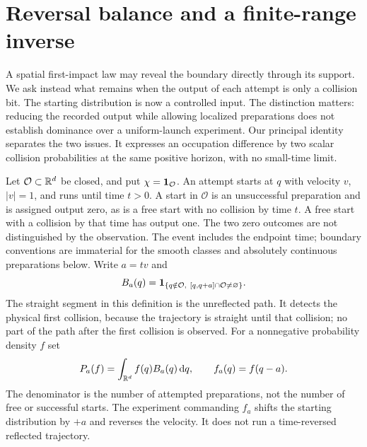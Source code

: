 \section{Reversal balance and a finite-range inverse}
\label{sec:reversal}
A spatial first-impact law may reveal the boundary directly through its
support. We ask instead what remains when the output of each attempt is
only a collision bit. The starting distribution is now a controlled
input. The distinction matters: reducing the recorded output while
allowing localized preparations does not establish dominance over a
uniform-launch experiment. Our principal identity separates the two
issues. It expresses an occupation difference by two scalar collision
probabilities at the same positive horizon, with no small-time limit.

Let $\mathcal O\subset\mathbb R^d$ be closed, and put $\chi=\mathbf 1_{\mathcal O}$.
An attempt starts at $q$ with velocity $v$, $|v|=1$, and runs until time
$t>0$. A start in $\mathcal O$ is an unsuccessful preparation and is
assigned output zero, as is a free start with no collision by time $t$.
A free start with a collision by that time has output one. The two zero
outcomes are not distinguished by the observation. The event includes
the endpoint time; boundary conventions are immaterial for the smooth
classes and absolutely continuous preparations below. Write $a=tv$ and
\begin{equation}\label{eq:bit}
 B_a(q)=\mathbf 1_{\{q\notin\mathcal O,\ [q,q+a]\cap\mathcal O\ne\varnothing\}}.
\end{equation}
The straight segment in this definition is the unreflected path. It
detects the physical first collision, because the trajectory is straight
until that collision; no part of the path after the first collision is
observed. For a nonnegative probability density $f$ set
\[
 P_a(f)=\int_{\mathbb R^d}f(q)B_a(q)\,\mathrm d q,\qquad f_a(q)=f(q-a).
\]
The denominator is the number of attempted preparations, not the number
of free or successful starts. The experiment commanding $f_a$ shifts
the starting distribution by $+a$ and reverses the velocity. It does
not run a time-reversed reflected trajectory.

